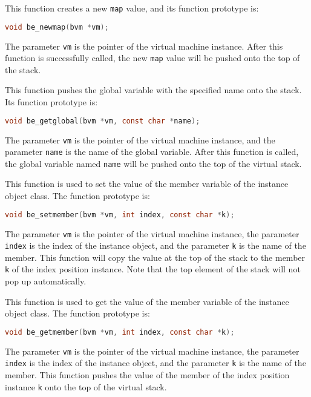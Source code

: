 
This function creates a new \texttt{map} value, and its function prototype is:
\begin{lstlisting}[language=c, style=berry, numbers=none]
void be_newmap(bvm *vm);
\end{lstlisting}
The parameter \texttt{vm} is the pointer of the virtual machine instance. After this function is successfully called, the new \texttt{map} value will be pushed onto the top of the stack.


This function pushes the global variable with the specified name onto the stack. Its function prototype is:
\begin{lstlisting}[language=c, style=berry, numbers=none]
void be_getglobal(bvm *vm, const char *name);
\end{lstlisting}
The parameter \texttt{vm} is the pointer of the virtual machine instance, and the parameter \texttt{name} is the name of the global variable. After this function is called, the global variable named \texttt{name} will be pushed onto the top of the virtual stack.


This function is used to set the value of the member variable of the instance object class. The function prototype is:
\begin{lstlisting}[language=c, style=berry, numbers=none]
void be_setmember(bvm *vm, int index, const char *k);
\end{lstlisting}
The parameter \texttt{vm} is the pointer of the virtual machine instance, the parameter \texttt{index} is the index of the instance object, and the parameter \texttt{k} is the name of the member. This function will copy the value at the top of the stack to the member \texttt{k} of the index position instance. Note that the top element of the stack will not pop up automatically.


This function is used to get the value of the member variable of the instance object class. The function prototype is:
\begin{lstlisting}[language=c, style=berry, numbers=none]
void be_getmember(bvm *vm, int index, const char *k);
\end{lstlisting}
The parameter \texttt{vm} is the pointer of the virtual machine instance, the parameter \texttt{index} is the index of the instance object, and the parameter \texttt{k} is the name of the member. This function pushes the value of the member of the index position instance \texttt{k} onto the top of the virtual stack.

